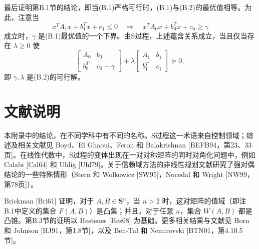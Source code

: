 最后证明第B.1节的结论，即当(B.1)严格可行时，(B.1)与(B.2)的最优值相等。为此，注意当
\[
 x^TA_1x+b_1^Tx+c_1\leq0
 \quad\Longrightarrow\quad
 x^TA_0x+b_0^Tx+c_0\geq\gamma
\]
成立时，$\gamma$ 是(B.1)最优值的一个下界。由S过程，上述蕴含关系成立，当且仅当存在 $\lambda\geq0$ 使
\[
 \begin{bmatrix}A_0&b_0\\b_0^T&c_0-\gamma\end{bmatrix}
 +\lambda\begin{bmatrix}A_1&b_1\\b_1^T&c_1\end{bmatrix}\succeq0,
\]
即 $\gamma,\lambda$ 是(B.2)的可行解。

\section*{文献说明}
本附录中的结论，在不同学科中有不同的名称。S过程这一术语来自控制领域；综述及相关文献见 Boyd、El Ghaoui、Feron 和 Balakrishnan [BEFB94，第23、33页]。在线性代数中，S过程的变体出现在一对对称矩阵的同时对角化问题中，例如 Calabi [Cal64] 和 Uhlig [Uhl79]。关于信赖域方法的非线性规划文献研究了强对偶结论的一些特殊情形（Stern 和 Wolkowicz [SW95]，Nocedal 和 Wright [NW99，第78页]）。

Brickman [Bri61] 证明，对于 $A,B\in\mathbf S^n$，当 $n>2$ 时，这对矩阵的值域（即注B.1中定义的集合 $F(A,B)$）是凸集；并且，对于任意 $n$，集合 $W(A,B)$ 都是凸锥。第B.3节的证明以 Hestenes [Hes68] 为基础。更多相关结果与文献见 Horn 和 Johnson [HJ91，第1.8节]，以及 Ben-Tal 和 Nemirovski [BTN01，第4.10.5节]。
